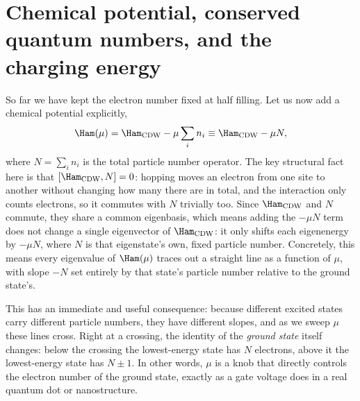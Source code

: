 \documentclass[all_sessions.tex]{subfiles}
\begin{document}
\section{Chemical potential, conserved quantum numbers, and the charging energy}
So far we have kept the electron number fixed at half filling. Let us now add a chemical potential
explicitly,
\begin{equation}
  \Ham(\mu) = \Ham_{\mathrm{CDW}} - \mu \sum_i n_i \equiv \Ham_{\mathrm{CDW}} - \mu N,
  \label{eq:muterm}
\end{equation}
where $N = \sum_i n_i$ is the total particle number operator. The key structural fact here is that
$[\Ham_{\mathrm{CDW}}, N] = 0$: hopping moves an electron from one site to another without changing
how many there are in total, and the interaction only counts electrons, so it commutes with $N$
trivially too. Since $\Ham_{\mathrm{CDW}}$ and $N$ commute, they share a common eigenbasis, which
means adding the $-\mu N$ term does not change a single eigenvector of $\Ham_{\mathrm{CDW}}$: it
only shifts each eigenenergy by $-\mu N$, where $N$ is that eigenstate's own, fixed particle
number. Concretely, this means every eigenvalue of $\Ham(\mu)$ traces out a straight line as a
function of $\mu$, with slope $-N$ set entirely by that state's particle number relative to the
ground state's.

This has an immediate and useful consequence: because different excited states carry different
particle numbers, they have different slopes, and as we sweep $\mu$ these lines cross. Right at a
crossing, the identity of the \emph{ground state} itself changes: below the crossing the
lowest-energy state has $N$ electrons, above it the lowest-energy state has $N\pm1$. In other
words, $\mu$ is a knob that directly controls the electron number of the ground state, exactly as
a gate voltage does in a real quantum dot or nanostructure.
\end{document}
